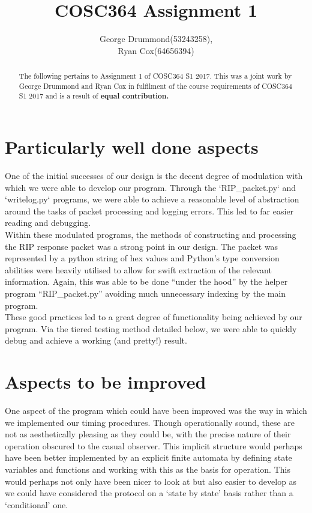 \documentclass[12pt,twoside]{article}
\begin{document}
\title{COSC364 Assignment 1}
\author{George Drummond(53243258), \\Ryan Cox(64656394)}
\maketitle
\thispagestyle{empty}

\begin{abstract}
The following pertains to Assignment 1 of COSC364 S1 2017.
This was a joint work by George Drummond and Ryan Cox in fulfilment of the course requirements of COSC364 S1 2017 and is a result of \bf{equal} contribution.
\end{abstract}

\tableofcontents

\section{ Particularly well done aspects}

One of the initial successes of our design is the decent degree of modulation with which we were able to develop our program. Through the ‘RIP\_packet.py‘ and ‘writelog.py‘ programs, we were able to achieve a reasonable level of abstraction around the tasks of packet processing and logging errors. This led to far easier reading and debugging.\\

Within these modulated programs, the methods of constructing and processing the RIP response packet was a strong point in our design. The packet was represented by a python string of hex values and Python’s type conversion abilities were heavily utilised to allow for swift extraction of the relevant information. Again, this was able to be done “under the hood” by the helper program “RIP\_packet.py” avoiding much unnecessary indexing by the main program.\\

These good practices led to a great degree of functionality being achieved by our program. Via the tiered testing method detailed below, we were able to quickly debug and achieve a working (and pretty!) result.
\section{Aspects to be improved}

One aspect of the program which could have been improved was the way in which we implemented our timing procedures. Though operationally sound, these are not as aesthetically pleasing as they could be, with the precise nature of their operation obscured to the casual observer. This implicit structure would perhaps have been better implemented by an explicit finite automata by defining state variables and functions and working with this as the basis for operation. This would perhaps not only have been nicer to look at but also easier to develop as we could have considered the protocol on a ‘state by state’ basis rather than a ‘conditional’ one.
\end{document}
